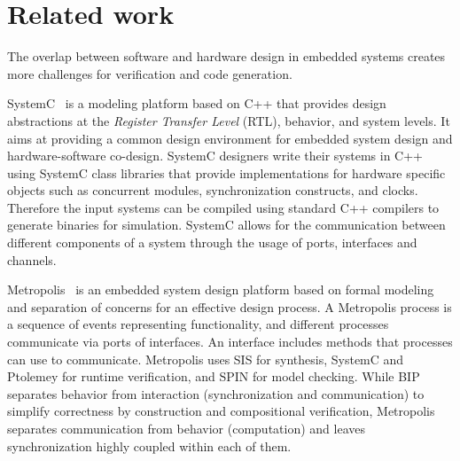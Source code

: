 
\section{Related work}
\label{sec:related}

The overlap between software and hardware design in embedded systems creates more challenges 
for verification and code generation. 

SystemC~\cite{systemc} is a modeling platform based on C++ that provides
design abstractions at the {\em Register Transfer Level} (RTL), behavior, and system levels. 
It aims at providing a common design environment for embedded system design and hardware-software
co-design. SystemC designers write their systems in C++ using SystemC class libraries that 
provide implementations for hardware specific objects such as concurrent modules, synchronization constructs,
and clocks.
Therefore the input systems can be compiled using standard C++ compilers to generate binaries
for simulation. SystemC allows for the communication between different components of a system
through the usage of ports, interfaces and channels.  

Metropolis~\cite{metropolis1,metropolis2} is an embedded system design platform based on 
formal modeling and separation of concerns for an effective
design process.%
A Metropolis process is a sequence of events representing
functionality, and different processes communicate via ports of interfaces.%
An interface includes methods that processes can use to communicate. 
Metropolis uses SIS for synthesis, SystemC and Ptolemey for runtime verification, and SPIN for model checking.
While BIP separates behavior from interaction (synchronization and communication) to simplify correctness by construction
and compositional verification, Metropolis separates communication from behavior (computation) and leaves synchronization 
highly coupled within each of them. 


